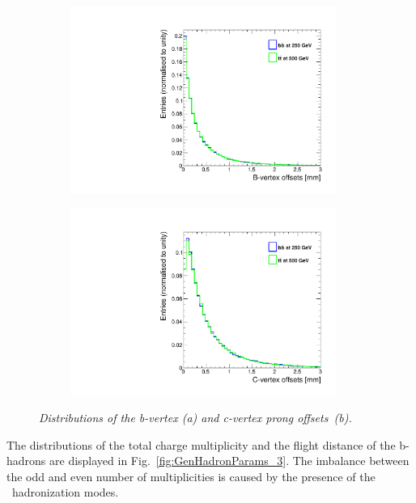 \begin{figure}[h]
\centering
\begin{subfigure}{0.5\textwidth}
    \includegraphics[width=0.95\textwidth]{ILD/plots/gen-bvtx-offsets.pdf}
\caption{\label{fig:GenVtxOffset_a_3} }
\end{subfigure}%
  \begin{subfigure}{0.5\textwidth}
\centering
    \includegraphics[width=0.95\textwidth]{ILD/plots/gen-cvtx-offsets.pdf}
\caption{\label{fig:GenVtxOffset_b_3} }
\end{subfigure}
    \caption{\sl Distributions of the b-vertex (a) and c-vertex prong offsets~(b). }
    \label{fig:GenVtxOffset_3}
\end{figure}

The distributions of the total charge multiplicity and the flight distance of the b-hadrons are displayed in Fig.~\ref{fig:GenHadronParams_3}.
The imbalance between the odd and even number of multiplicities is caused by the presence of the \Bzs\ hadronization modes.

